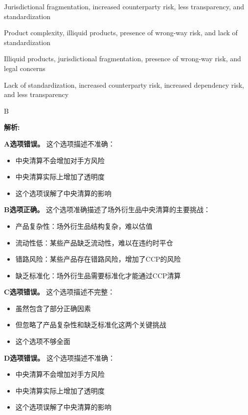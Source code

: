 \documentclass{article}
\newenvironment{explanation}
{\textbf{解析:}\par}
{\par}
\begin{document}
\begin{choices}
    \item Jurisdictional fragmentation, increased counterparty risk, less transparency, and standardization
    \item Product complexity, illiquid products, presence of wrong-way risk, and lack of standardization
    \item Illiquid products, jurisdictional fragmentation, presence of wrong-way risk, and legal concerns
    \item Lack of standardization, increased counterparty risk, increased dependency risk, and less transparency
\end{choices}

\begin{correctanswer}
    B
\end{correctanswer}

\begin{explanation}
    \textbf{A选项错误。}
    这个选项描述不准确：
    \begin{itemize}
        \item 中央清算不会增加对手方风险
        \item 中央清算实际上增加了透明度
        \item 这个选项误解了中央清算的影响
    \end{itemize}

    \textbf{B选项正确。}
    这个选项准确描述了场外衍生品中央清算的主要挑战：
    \begin{itemize}
        \item 产品复杂性：场外衍生品结构复杂，难以估值
        \item 流动性低：某些产品缺乏流动性，难以在违约时平仓
        \item 错路风险：某些产品存在错路风险，增加了CCP的风险
        \item 缺乏标准化：场外衍生品需要标准化才能通过CCP清算
    \end{itemize}

    \textbf{C选项错误。}
    这个选项描述不完整：
    \begin{itemize}
        \item 虽然包含了部分正确因素
        \item 但忽略了产品复杂性和缺乏标准化这两个关键挑战
        \item 这个选项不够全面
    \end{itemize}

    \textbf{D选项错误。}
    这个选项描述不准确：
    \begin{itemize}
        \item 中央清算不会增加对手方风险
        \item 中央清算实际上增加了透明度
        \item 这个选项误解了中央清算的影响
    \end{itemize}
\end{explanation}
\end{document}
